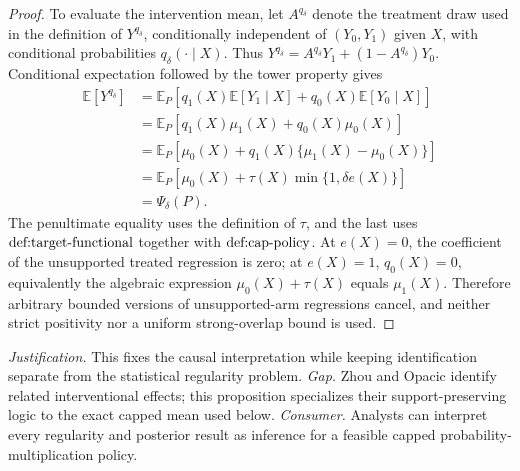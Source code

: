 \documentclass{article}
\begin{document}
\begin{proof}
To evaluate the intervention mean, let \(A^{q_\delta}\) denote the treatment draw used in the definition of \(Y^{q_\delta}\), conditionally independent of \((Y_0,Y_1)\) given \(X\), with conditional probabilities \(q_\delta(\cdot\mid X)\).  Thus \(Y^{q_\delta}=A^{q_\delta}Y_1+(1-A^{q_\delta})Y_0\).  Conditional expectation followed by the tower property gives
\[
\begin{aligned}
\mathbb E[Y^{q_\delta}]
&=\mathbb E_P\!\left[q_1(X)\mathbb E[Y_1\mid X]+q_0(X)\mathbb E[Y_0\mid X]\right] \\
&=\mathbb E_P\!\left[q_1(X)\mu_1(X)+q_0(X)\mu_0(X)\right] \\
&=\mathbb E_P\!\left[\mu_0(X)+q_1(X)\{\mu_1(X)-\mu_0(X)\}\right] \\
&=\mathbb E_P\!\left[\mu_0(X)+\tau(X)\min\{1,\delta e(X)\}\right] \\
&=\Psi_\delta(P).
\end{aligned}
\]
The penultimate equality uses the definition of \(\tau\), and the last uses \(\textnormal{def:target-functional}\) together with \(\textnormal{def:cap-policy}\).  At \(e(X)=0\), the coefficient of the unsupported treated regression is zero; at \(e(X)=1\), \(q_0(X)=0\), equivalently the algebraic expression \(\mu_0(X)+\tau(X)\) equals \(\mu_1(X)\).  Therefore arbitrary bounded versions of unsupported-arm regressions cancel, and neither strict positivity nor a uniform strong-overlap bound is used.
\end{proof}
\par\smallskip\noindent \textit{Justification.} This fixes the causal interpretation while keeping identification separate from the statistical regularity problem. \textit{Gap.} Zhou and Opacic identify related interventional effects; this proposition specializes their support-preserving logic to the exact capped mean used below. \textit{Consumer.} Analysts can interpret every regularity and posterior result as inference for a feasible capped probability-multiplication policy.
\end{document}
